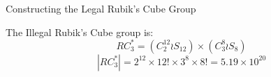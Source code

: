 \documentclass[final]{beamer}
\newlength{\colwidth}
\begin{document}
\begin{frame}[t]
\begin{columns}[t]
\begin{column}{\colwidth}



  \begin{block}{Constructing the Legal Rubik's Cube Group}
    


    
    The Illegal Rubik's Cube group is:
    $$RC^{*}_{3} = (C^{12}_2 \wr S_{12}) \times (C^8_3 \wr S_8)$$
    $$|RC^{*}_{3}| = 2^{12} \times 12! \times 3^8 \times 8! = 5.19 \times 10^{20}$$
    

\end{block}
\end{column}
\end{columns}
\end{frame}
\end{document}

